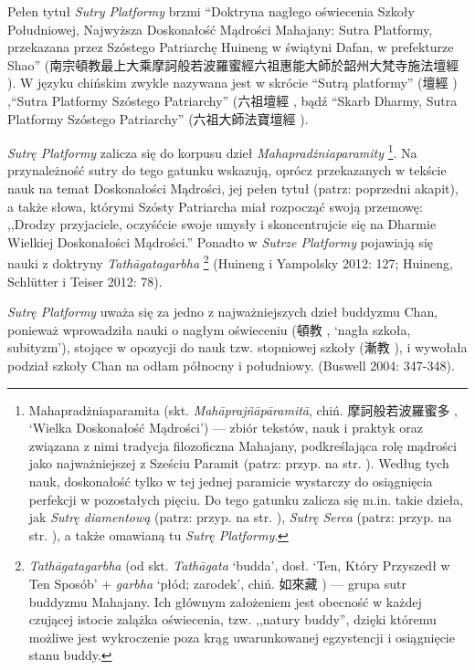 Pełen tytuł \textit{Sutry Platformy} brzmi ``Doktryna nagłego oświecenia Szkoły Południowej, Najwyższa Doskonałość Mądrości Mahajany: Sutra Platformy, przekazana przez Szóstego Patriarchę Huineng w świątyni Dafan, w prefekturze Shao'' (南宗頓教最上大乘摩訶般若波羅蜜經六祖惠能大師於韶州大梵寺施法壇經 ).
W języku chińskim zwykle nazywana jest w skrócie ``Sutrą platformy'' (壇經 ) ,``Sutra Platformy Szóstego Patriarchy'' (六祖壇經 , bądź ``Skarb Dharmy, Sutra Platformy Szóstego Patriarchy'' (六祖大師法寶壇經 ).

\textit{Sutrę Platformy} zalicza się do korpusu dzieł \textit{Mahapradżniaparamity}%
\footnote{Mahapradżniaparamita (skt. \textit{Mahāprajñāpāramitā}, chiń. 摩訶般若波羅蜜多 , `Wielka Doskonałość Mądrości') --- zbiór tekstów, nauk i praktyk oraz związana z nimi tradycja filozoficzna Mahajany, podkreślająca rolę mądrości jako najważniejszej z Sześciu Paramit (patrz: przyp. na str. \pageref{Paramitas}).
Według tych nauk, doskonałość tylko w tej jednej paramicie wystarczy do osiągnięcia perfekcji w pozostałych pięciu. Do tego gatunku zalicza się m.in. takie dzieła, jak \textit{Sutrę diamentową} (patrz: przyp. na str. \pageref{DiamondSutra}), \textit{Sutrę Serca} (patrz: przyp. na str. \pageref{HeartSutra}), a także omawianą tu \textit{Sutrę Platformy}.}.
Na przynależność sutry do tego gatunku wskazują, oprócz przekazanych w tekście nauk na temat Doskonałości Mądrości, jej pełen tytuł (patrz: poprzedni akapit), a także słowa, którymi Szósty Patriarcha miał rozpocząć swoją przemowę: ,,Drodzy przyjaciele, oczyśćcie swoje umysły i skoncentrujcie się na Dharmie Wielkiej Doskonałości Mądrości.''
Ponadto w \textit{Sutrze Platformy} pojawiają się nauki z doktryny \textit{Tathāgatagarbha}%
\footnote{\textit{Tathāgatagarbha} (od skt. \textit{Tathāgata} `budda', dosł. `Ten, Który Przyszedł w Ten Sposób' + \textit{garbha} `płód; zarodek', chiń. 如來藏 ) --- grupa sutr buddyzmu Mahajany.
Ich głównym założeniem jest obecność w każdej czującej istocie zalążka oświecenia, tzw. ,,natury buddy'', dzięki któremu możliwe jest wykroczenie poza krąg uwarunkowanej egzystencji i osiągnięcie stanu buddy.} %
(Huineng i Yampolsky 2012: 127; Huineng, Schlütter i Teiser 2012: 78).

\textit{Sutrę Platformy} uważa się za jedno z najważniejszych dzieł buddyzmu Chan, ponieważ wprowadziła nauki o nagłym oświeceniu (頓教 , `nagła szkoła, subityzm'), stojące w opozycji do nauk tzw. stopniowej szkoły (漸教 ), i wywołała podział szkoły Chan na odłam północny i południowy. %
(Buswell 2004: 347-348).%

